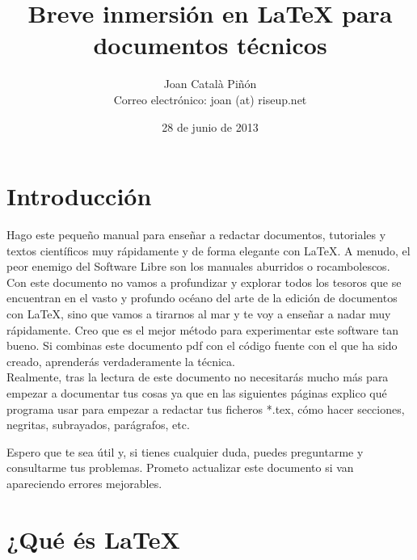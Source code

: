 \documentclass[11pt]{article}
\title{\textbf{Breve inmersión en {\LaTeX} para documentos técnicos}}
\author{Joan Català Piñón\\
        Correo electrónico: joan (at) riseup.net
       }
\date{28 de junio de 2013}
\begin{document}
\maketitle


\newpage

\tableofcontents

\newpage

 \listoffigures
 
\newpage

\section{Introducción}

Hago este pequeño manual para enseñar a redactar documentos, tutoriales y textos científicos muy rápidamente y de forma elegante con {\LaTeX}. A menudo, el peor enemigo del Software
Libre son los manuales aburridos o rocambolescos. Con este
documento no vamos a profundizar y explorar todos los tesoros
que se encuentran en el vasto y profundo océano del arte de la
edición de documentos con {\LaTeX}, sino que vamos a tirarnos
al mar y te voy a enseñar a nadar muy rápidamente. Creo que es
el mejor método para experimentar este software tan bueno. Si
combinas este documento pdf con el código fuente con el que ha
sido creado, aprenderás verdaderamente la técnica.	\\

Realmente, tras la lectura de este documento no necesitarás mucho más para empezar a documentar tus cosas ya que en las siguientes páginas explico qué programa usar para empezar a redactar tus ficheros *.tex, cómo hacer secciones, negritas, subrayados, parágrafos, etc.

Espero que te sea útil y, si tienes cualquier duda, puedes preguntarme y consultarme tus problemas. Prometo actualizar este documento si van apareciendo errores mejorables.

\section{¿Qué és {\LaTeX}}
\end{document}
